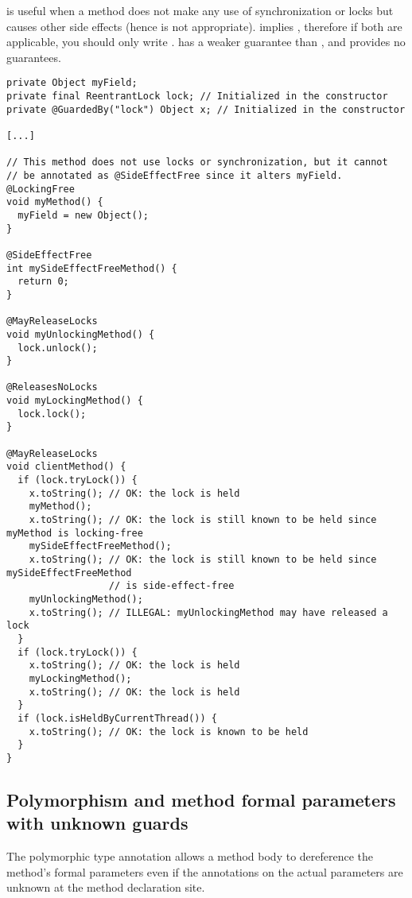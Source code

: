  is useful when a method does not make any use of synchronization
or locks but causes other side effects (hence  is not appropriate).
 implies , therefore if both are applicable,
you should only write .  has a weaker guarantee
than , and  provides no guarantees.

\begin{verbatim}
private Object myField;
private final ReentrantLock lock; // Initialized in the constructor
private @GuardedBy("lock") Object x; // Initialized in the constructor

[...]

// This method does not use locks or synchronization, but it cannot
// be annotated as @SideEffectFree since it alters myField.
@LockingFree
void myMethod() {
  myField = new Object();
}

@SideEffectFree
int mySideEffectFreeMethod() {
  return 0;
}

@MayReleaseLocks
void myUnlockingMethod() {
  lock.unlock();
}

@ReleasesNoLocks
void myLockingMethod() {
  lock.lock();
}

@MayReleaseLocks
void clientMethod() {
  if (lock.tryLock()) {
    x.toString(); // OK: the lock is held
    myMethod();
    x.toString(); // OK: the lock is still known to be held since myMethod is locking-free
    mySideEffectFreeMethod();
    x.toString(); // OK: the lock is still known to be held since mySideEffectFreeMethod
                  // is side-effect-free
    myUnlockingMethod();
    x.toString(); // ILLEGAL: myUnlockingMethod may have released a lock
  }
  if (lock.tryLock()) {
    x.toString(); // OK: the lock is held
    myLockingMethod();
    x.toString(); // OK: the lock is held
  }
  if (lock.isHeldByCurrentThread()) {
    x.toString(); // OK: the lock is known to be held
  }
}
\end{verbatim}


\subsection{Polymorphism and method formal parameters with unknown guards\label{lock-checker-polymorphism-example}}

The polymorphic  type annotation allows a method body
to dereference the method's formal parameters even if the
 annotations on the actual parameters are unknown at
the method declaration site.


